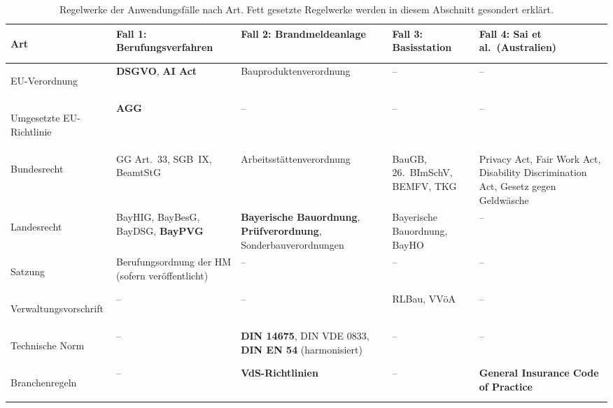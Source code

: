 \begin{table}[H]
  \centering
  \small
  \renewcommand{\arraystretch}{1.3}
  \begin{tabularx}{\textwidth}{>{\bfseries\raggedright\arraybackslash}p{2.2cm} Y Y Y Y}
    \toprule
    Art & \textbf{Fall 1: Berufungsverfahren} & \textbf{Fall 2: Brandmeldeanlage} & \textbf{Fall 3: Basisstation} & \textbf{Fall 4: Sai et al.\ (Australien)} \\
    \midrule
    EU-Verordnung & \textbf{DSGVO}, \textbf{AI Act} & Bau\-produkten\-verordnung & -- & -- \\
    Umgesetzte EU-Richtlinie & \textbf{AGG} & -- & -- & -- \\
    Bundesrecht & GG Art.~33, SGB~IX, BeamtStG & Arbeits\-stätten\-verordnung & BauGB, 26.~BImSchV, BEMFV, TKG & Privacy Act, Fair Work Act, Disability Discrimination Act, Gesetz gegen Geldwäsche \\
    Landesrecht & BayHIG, BayBesG, BayDSG, \textbf{BayPVG} & \textbf{Bayerische Bauordnung}, \textbf{Prüfverordnung}, Sonderbauverordnungen & Bayerische Bauordnung, BayHO & -- \\
    Satzung & Berufungsordnung der HM (sofern veröffentlicht) & -- & -- & -- \\
    Verwaltungs\-vorschrift & -- & -- & RLBau, VVöA & -- \\
    Technische Norm & -- & \textbf{DIN 14675}, DIN VDE 0833, \textbf{DIN EN 54} (harmonisiert) & -- & -- \\
    Branchenregeln & -- & \textbf{VdS-Richtlinien} & -- & \textbf{General Insurance Code of Practice} \\
    \bottomrule
  \end{tabularx}
  \caption[Regelwerke der Anwendungsfälle nach Art]{Regelwerke der Anwendungsfälle nach Art. Fett gesetzte Regelwerke werden in diesem Abschnitt gesondert erklärt.}
  \label{tab:regelwerke}
\end{table}
